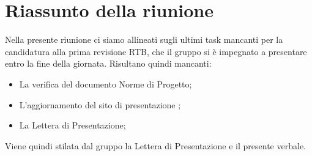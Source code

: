 \section{Riassunto della riunione}
Nella presente riunione ci siamo allineati sugli ultimi task mancanti per la candidatura alla prima revisione RTB, che il gruppo si è impegnato a presentare entro la fine della giornata. Risultano quindi mancanti:
\begin{itemize}
    \item La verifica del documento Norme di Progetto;
    \item L'aggiornamento del sito di presentazione ;
    \item La Lettera di Presentazione;
\end{itemize}

Viene quindi stilata dal gruppo la Lettera di Presentazione e il presente verbale.
